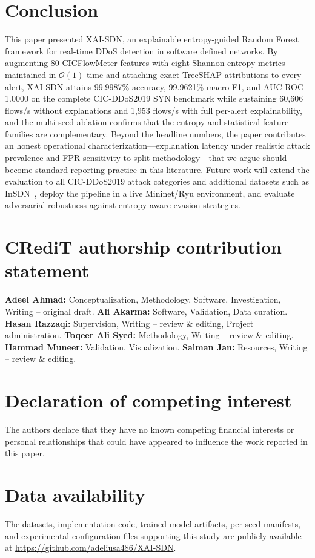 ﻿\documentclass[journal]{IEEEtran}
\begin{document}
\section{Conclusion}
\label{sec:conclusion}

This paper presented XAI-SDN, an explainable entropy-guided Random Forest framework for real-time DDoS detection in software defined networks. By augmenting 80 CICFlowMeter features with eight Shannon entropy metrics maintained in $\mathcal{O}(1)$ time and attaching exact TreeSHAP attributions to every alert, XAI-SDN attains 99.9987\% accuracy, 99.9621\% macro F1, and AUC-ROC 1.0000 on the complete CIC-DDoS2019 SYN benchmark while sustaining 60,606 flows/s without explanations and 1,953 flows/s with full per-alert explainability, and the multi-seed ablation confirms that the entropy and statistical feature families are complementary. Beyond the headline numbers, the paper contributes an honest operational characterization---explanation latency under realistic attack prevalence and FPR sensitivity to split methodology---that we argue should become standard reporting practice in this literature. Future work will extend the evaluation to all CIC-DDoS2019 attack categories and additional datasets such as InSDN~\cite{elsayed2020insdn}, deploy the pipeline in a live Mininet/Ryu environment, and evaluate adversarial robustness against entropy-aware evasion strategies.

\section*{CRediT authorship contribution statement}
\textbf{Adeel Ahmad:} Conceptualization, Methodology, Software, Investigation, Writing -- original draft. \textbf{Ali Akarma:} Software, Validation, Data curation. \textbf{Hasan Razzaqi:} Supervision, Writing -- review \& editing, Project administration. \textbf{Toqeer Ali Syed:} Methodology, Writing -- review \& editing. \textbf{Hammad Muneer:} Validation, Visualization. \textbf{Salman Jan:} Resources, Writing -- review \& editing.

\section*{Declaration of competing interest}
The authors declare that they have no known competing financial interests or personal relationships that could have appeared to influence the work reported in this paper.

\section*{Data availability}
The datasets, implementation code, trained-model artifacts, per-seed manifests, and experimental configuration files supporting this study are publicly available at \url{https://github.com/adeliusa486/XAI-SDN}.



\end{document}
